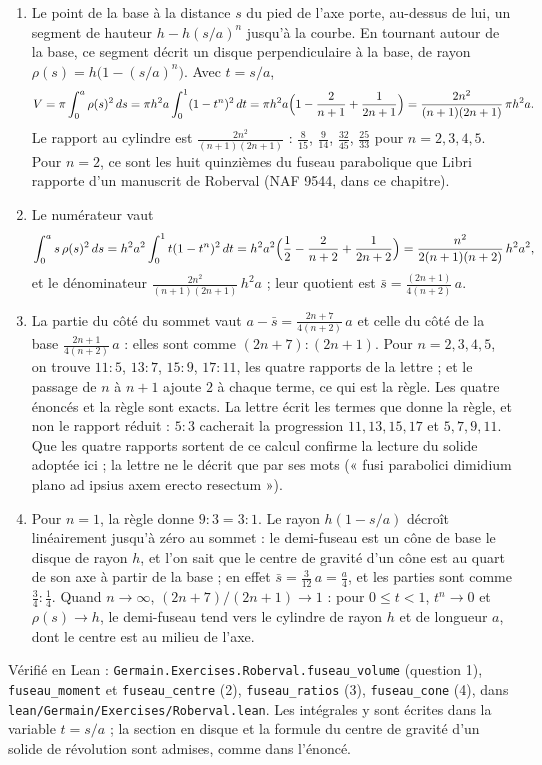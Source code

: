 \documentclass[11pt,a4paper]{article}
\begin{document}
\begin{solution}
\begin{enumerate}
\item Le point de la base à la distance $s$ du pied de l'axe porte, au-dessus de
  lui, un segment de hauteur $h - h(s/a)^n$ jusqu'à la courbe. En tournant autour de
  la base, ce segment décrit un disque perpendiculaire à la base, de rayon
  $\rho(s) = h\bigl(1 - (s/a)^n\bigr)$. Avec $t = s/a$,
  \[
  V = \pi\int_0^a \rho(s)^2\,ds = \pi h^2 a\int_0^1 (1 - t^n)^2\,dt
  = \pi h^2 a\Bigl(1 - \frac{2}{n+1} + \frac{1}{2n+1}\Bigr)
  = \frac{2n^2}{(n+1)(2n+1)}\,\pi h^2 a .
  \]
  Le rapport au cylindre est $\frac{2n^2}{(n+1)(2n+1)}$ : $\frac{8}{15}$,
  $\frac{9}{14}$, $\frac{32}{45}$, $\frac{25}{33}$ pour $n = 2, 3, 4, 5$. Pour
  $n = 2$, ce sont les huit quinzièmes du fuseau parabolique que Libri rapporte
  d'un manuscrit de Roberval (NAF 9544, dans ce chapitre).
\item Le numérateur vaut
  \[
  \int_0^a s\,\rho(s)^2\,ds = h^2a^2\int_0^1 t(1 - t^n)^2\,dt
  = h^2a^2\Bigl(\frac12 - \frac{2}{n+2} + \frac{1}{2n+2}\Bigr)
  = \frac{n^2}{2(n+1)(n+2)}\,h^2a^2 ,
  \]
  et le dénominateur $\frac{2n^2}{(n+1)(2n+1)}\,h^2 a$ ; leur quotient est
  $\bar s = \frac{(2n+1)}{4(n+2)}\,a$.
\item La partie du côté du sommet vaut $a - \bar s = \frac{2n + 7}{4(n+2)}\,a$ et
  celle du côté de la base $\frac{2n+1}{4(n+2)}\,a$ : elles sont comme
  $(2n + 7) : (2n + 1)$. Pour $n = 2, 3, 4, 5$, on trouve $11 : 5$, $13 : 7$,
  $15 : 9$, $17 : 11$, les quatre rapports de la lettre ; et le passage de $n$ à
  $n + 1$ ajoute $2$ à chaque terme, ce qui est la règle. Les quatre énoncés et la
  règle sont exacts. La lettre écrit les termes que donne la règle, et non le
  rapport réduit : $5 : 3$ cacherait la progression $11, 13, 15, 17$ et
  $5, 7, 9, 11$. Que les quatre rapports sortent de ce calcul confirme la lecture
  du solide adoptée ici ; la lettre ne le décrit que par ses mots (« fusi
  parabolici dimidium plano ad ipsius axem erecto resectum »).
\item Pour $n = 1$, la règle donne $9 : 3 = 3 : 1$. Le rayon $h(1 - s/a)$ décroît
  linéairement jusqu'à zéro au sommet : le demi-fuseau est un cône de base le
  disque de rayon $h$, et l'on sait que le centre de gravité d'un cône est au
  quart de son axe à partir de la base ; en effet $\bar s = \frac{3}{12}\,a =
  \frac a4$, et les parties sont comme $\frac34 : \frac14$. Quand $n \to \infty$,
  $(2n + 7)/(2n + 1) \to 1$ : pour $0 \le t < 1$, $t^n \to 0$ et $\rho(s) \to h$, le
  demi-fuseau tend vers le cylindre de rayon $h$ et de longueur $a$, dont le
  centre est au milieu de l'axe.
\end{enumerate}

Vérifié en Lean : \texttt{Germain.Exercises.Roberval.fuseau\_volume} (question 1),
\texttt{fuseau\_moment} et \texttt{fuseau\_centre} (2), \texttt{fuseau\_ratios} (3),
\texttt{fuseau\_cone} (4), dans \texttt{lean/Germain/Exercises/Roberval.lean}. Les intégrales y sont écrites dans la
variable $t = s/a$ ; la section en disque et la formule du centre de gravité d'un solide de
révolution sont admises, comme dans l'énoncé.
\end{solution}
\end{document}
